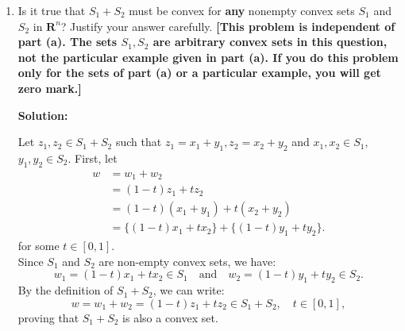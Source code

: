 \documentclass[11pt]{article}
\newenvironment{solution}
  {\par\noindent\textbf{Solution:}\par}
  {\par}
\begin{document}
\begin{enumerate}
\begin{enumerate}[label=(\alph*)]
\begin{solution}
\begin{figure}[H]
\end{figure}


        \end{solution}
      \item Is it true that $S_1 + S_2$ must be convex for \textbf{any} nonempty convex sets $S_1$ and $S_2$ in
        $\mathbf{R}^n$? Justify your answer carefully. \textbf{[This problem is independent of part (a). 
        The sets $S_1,S_2$ are arbitrary convex sets in this question, not the particular example given in part (a).
        If you do this problem only for the sets of part (a) or a particular example, you will get zero mark.]}
        \begin{solution}
          Let $z_1,z_2 \in S_1 + S_2$ such that $z_1 = x_1 + y_1,z_2 = x_2 + y_2$ and $x_1,x_2 \in S_1$, $y_1,y_2 \in S_2$.
          First, let 
          \begin{align*}
            w &= w_1 + w_2 \\
              &= (1-t)z_1 + tz_2 \\
              &= (1-t)(x_1 + y_1) + t(x_2 + y_2) \\
              &= \{(1-t)x_1 + tx_2\} + \{(1-t)y_1 + ty_2\}.
          \end{align*}
          for some $t \in [0,1]$. \\ 
          Since $S_1$ and $S_2$ are non-empty convex sets, we have:
          \[
          w_1 = (1-t)x_1 + tx_2 \in S_1 \quad \text{and} \quad w_2 = (1-t)y_1 + ty_2 \in S_2.
          \]
          By the definition of $S_1 + S_2$, we can write:
          \[
          w = w_1 + w_2 = (1-t)z_1 + tz_2 \in S_1 + S_2, \quad t \in [0,1],
          \]
          proving that $S_1 + S_2$ is also a convex set.
      \end{solution}
    \end{enumerate}
\end{enumerate}
\end{document}
